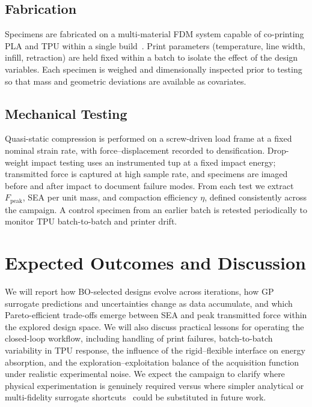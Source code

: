 \documentclass[10pt]{article}
\begin{document}
\subsection{Fabrication}
Specimens are fabricated on a multi-material FDM system capable of
co-printing PLA and TPU within a single build~\citep{ye2023multimaterial}.
Print parameters (temperature, line width, infill, retraction) are
held fixed within a batch to isolate the effect of the design
variables. Each specimen is weighed and dimensionally inspected prior
to testing so that mass and geometric deviations are available as
covariates.

\subsection{Mechanical Testing}
Quasi-static compression is performed on a screw-driven load frame at
a fixed nominal strain rate, with force--displacement recorded to
densification. Drop-weight impact testing uses an instrumented tup at
a fixed impact energy; transmitted force is captured at high sample
rate, and specimens are imaged before and after impact to document
failure modes. From each test we extract $F_\mathrm{peak}$, SEA per
unit mass, and compaction efficiency $\eta$, defined consistently
across the campaign. A control specimen from an earlier batch is
retested periodically to monitor TPU batch-to-batch and printer drift.

\section{Expected Outcomes and Discussion}
We will report how BO-selected designs evolve across iterations, how
GP surrogate predictions and uncertainties change as data accumulate,
and which Pareto-efficient trade-offs emerge between SEA and peak
transmitted force within the explored design space. We will also
discuss practical lessons for operating the closed-loop workflow,
including handling of print failures, batch-to-batch variability in
TPU response, the influence of the rigid--flexible interface on
energy absorption, and the exploration--exploitation balance of the
acquisition function under realistic experimental noise. We expect
the campaign to clarify where physical experimentation is genuinely
required versus where simpler analytical or multi-fidelity surrogate
shortcuts~\citep{mo2023accelerated} could be
substituted in future work.
\end{document}

